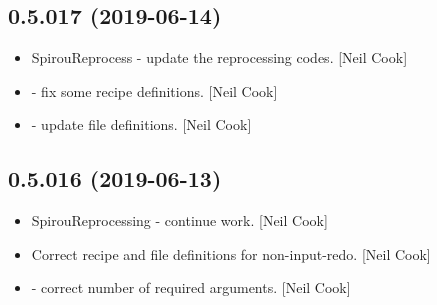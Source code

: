 \documentclass[a4paper,10pt,english]{report}
\begin{document}
\subsection{0.5.017 (2019-06-14)}
\label{\detokenize{misc/changelog:id120}}\begin{itemize}
\item {} 
SpirouReprocess - update the reprocessing codes. {[}Neil Cook{]}

\item {} 
 - fix some recipe definitions. {[}Neil Cook{]}

\item {} 
 - update file definitions. {[}Neil Cook{]}

\end{itemize}


\subsection{0.5.016 (2019-06-13)}
\label{\detokenize{misc/changelog:id121}}\begin{itemize}
\item {} 
SpirouReprocessing - continue work. {[}Neil Cook{]}

\item {} 
Correct recipe and file definitions for non-input-redo. {[}Neil Cook{]}

\item {} 
 - correct number of required arguments. {[}Neil
Cook{]}

\end{itemize}
\end{document}
